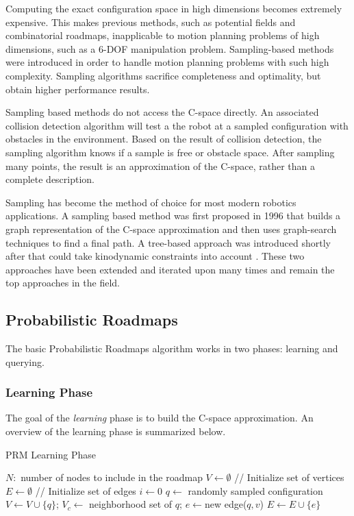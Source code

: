 \documentclass[10pt,conference]{ieeeconf}
\begin{document}
Computing the exact configuration space in high dimensions becomes extremely expensive. This makes previous methods, such as potential fields and combinatorial roadmaps, inapplicable to motion planning problems of high dimensions, such as a 6-DOF manipulation problem. Sampling-based methods were introduced in order to handle motion planning problems with such high complexity. Sampling algorithms sacrifice completeness and optimality, but obtain higher performance results. 

Sampling based methods do not access the C-space directly. An associated collision detection algorithm will test a the robot at a sampled configuration with obstacles in the environment. Based on the result of collision detection, the sampling algorithm knows if a sample is free or obstacle space. After sampling many points, the result is an approximation of the C-space, rather than a complete description. 

Sampling has become the method of choice for most modern robotics applications. A sampling based method was first proposed in 1996 \cite{PRM} that builds a graph representation of the C-space approximation and then uses graph-search techniques to find a final path. A tree-based approach was introduced shortly after that could take kinodynamic constraints into account \cite{RRT}. These two approaches have been extended and iterated upon many times and remain the top approaches in the field.

\subsection{Probabilistic Roadmaps}

The basic Probabilistic Roadmaps algorithm \cite{PRM} works in two phases: learning and querying. 

\subsubsection{Learning Phase}

The goal of the \emph{learning} phase is to build the C-space approximation. An overview of the learning phase is summarized below.

\begin{algorithm}
\caption{PRM Learning Phase}
\begin{algorithmic}[1]
\State $N: $ number of nodes to include in the roadmap
\State $V \leftarrow \emptyset$ // Initialize set of vertices
\State $E \leftarrow \emptyset$ // Initialize set of edges
\State $i \leftarrow 0$
\State $q \leftarrow $ randomly sampled configuration
	\State $V \leftarrow V \cup \{q\}$;
	\State $V_c \leftarrow $ neighborhood set of $q$;
			\State $e \leftarrow $new edge($q,v$)
			\State $E \leftarrow E \cup \{e\}$
		\EndIf
	\EndFor
\EndIf
\EndWhile
\end{algorithmic}
\end{algorithm}
\end{document}
